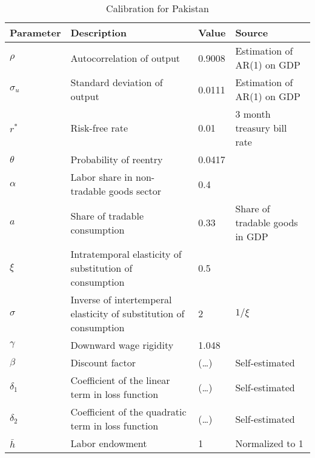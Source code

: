 \begin{table}[h]
    \centering
    \begin{tabular}{@{}llll@{}}
        \toprule
    Parameter  & Description                                                       & Value  & Source                                                                         \\ \midrule
    $\rho$     & Autocorrelation of output                                         & 0.9008  & Estimation of AR(1) on GDP\\
    $\sigma_u$ & Standard deviation of output                                      & 0.0111 & Estimation of AR(1) on GDP\\
    $r^*$      & Risk-free rate                                                    & 0.01 & 3 month treasury bill rate \\
    $\theta$   & Probability of reentry                                            & 0.0417 & \citet*{trebesch-2011-sovereign}                                              \\
    $\alpha$   & Labor share in non-tradable goods sector                          & 0.4   & \citet{Pakistan-DSGE-calibration}                                                       \\
    $a$        & Share of tradable consumption                                     & 0.33   &Share of tradable goods in GDP                    \\
    $\xi$      & Intratemporal elasticity of substitution of consumption & 0.5   & \citet{Na-18}                              \\
    $\sigma$   & Inverse of intertemperal elasticity of substitution of consumption  & 2   & $1 / \xi$                                                                      \\
    $\gamma$   & Downward wage rigidity                                            & 1.048   & \citet*{wage-rigidity-data}                  \\
    $\beta$    & Discount factor                                                   & (\dots)  &  Self-estimated \\
    $\delta_1$ & Coefficient of the linear term in loss function                   &  (\dots) &   Self-estimated  \\
    $\delta_2$ & Coefficient of the quadratic term in loss function                &  (\dots)   &     Self-estimated   \\
    $\bar{h}$  & Labor endowment                                                   & 1      & Normalized to 1\\
    \bottomrule
    \end{tabular}%
    \caption{Calibration for Pakistan}
    \label{tab:cal-pakistan}
    \end{table}